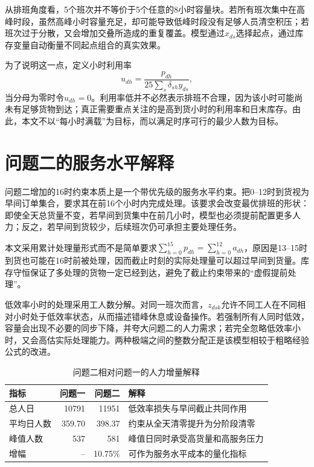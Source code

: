 从排班角度看，5个班次并不等价于5个任意的8小时容量块。若所有班次集中在高峰时段，虽然高峰小时容量充足，却可能导致低峰时段没有足够人员清空积压；若班次过于分散，又会增加交叠所造成的重复覆盖。模型通过$x_{ds}$选择起点，通过库存变量自动衡量不同起点组合的真实效果。

为了说明这一点，定义小时利用率
\begin{equation}
 u_{dh}=\frac{p_{dh}}{25\sum_s\delta_{sh}y_{ds}},
\end{equation}
当分母为零时令$u_{dh}=0$。利用率低并不必然表示排班不合理，因为该小时可能尚未有足够货物到达；真正需要重点关注的是高到货小时的利用率和日末库存。由此，本文不以“每小时满载”为目标，而以满足时序可行的最少人数为目标。

\section{问题二的服务水平解释}

问题二增加的16时约束本质上是一个带优先级的服务水平约束。把0--12时到货视为早间订单集合，要求其在前16个小时内完成处理。该要求会改变最优排班的形状：即使全天总货量不变，若早间到货集中在前几小时，模型也必须提前配置更多人力；反之，若早间到货较少，后续班次仍可承担主要处理任务。

本文采用累计处理量形式而不是简单要求$\sum_{h=0}^{15}p_{dh}=\sum_{h=0}^{12}a_{dh}$，原因是13--15时到货也可能在16时前被处理，因而截止时刻的实际处理量可以超过早间到货量。库存守恒保证了多处理的货物一定已经到达，避免了截止约束带来的“虚假提前处理”。

低效率小时的处理采用工人数分解。对同一班次而言，$z_{dsk}$允许不同工人在不同相对小时处于低效率状态，从而描述错峰休息或设备操作。若强制所有人同时低效，容量会出现不必要的同步下降，并夸大问题二的人力需求；若完全忽略低效率小时，又会高估实际处理能力。两种极端之间的整数分配正是该模型相较于粗略经验公式的改进。

\begin{table}[htbp]
\centering
\caption{问题二相对问题一的人力增量解释}
\label{tab:increment}
\begin{tabular}{lrrp{}}
\toprule
指标 & 问题一 & 问题二 & 解释\\
\midrule
总人日 & 10791 & 11951 & 低效率损失与早间截止共同作用\\
平均日人数 & 359.70 & 398.37 & 约束从全天清零提升为分阶段清零\\
峰值人数 & 537 & 581 & 峰值日同时承受高货量和高服务压力\\
增幅 & -- & 10.75\% & 可作为服务水平成本的量化指标\\
\bottomrule
\end{tabular}
\end{table}

